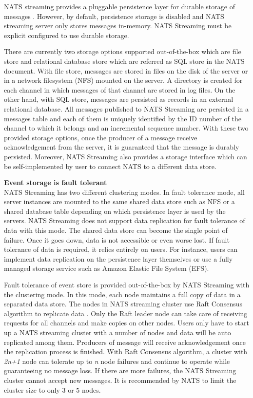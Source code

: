 NATS streaming provides a pluggable persistence layer for durable storage of messages \cite{natsstorage}. However, by default, persistence storage is disabled and NATS streaming server only stores messages in-memory. NATS Streaming must be explicit configured to use durable storage. 

There are currently two storage options supported out-of-the-box which are file store and relational database store which are referred as SQL store in the NATS document. With file store, messages are stored in files on the disk of the server or in a network filesystem (NFS) mounted on the server. A directory is created for each channel in which messages of that channel are stored in log files. On the other hand, with SQL store, messages are persisted as records in an external relational database. All messages published to NATS Streaming are persisted in a messages table and each of them is uniquely identified by the ID number of the channel to which it belongs and an incremental sequence number. With these two provided storage options, once the producer of a message receive acknowledgement from the server, it is guaranteed that the message is durably persisted. Moreover, NATS Streaming also provides a storage interface which can be self-implemented by user to connect NATS to a different data store. 

\textbf{Event storage is fault tolerant}\\
NATS Streaming has two different clustering modes. In fault tolerance mode, all server instances are mounted to the same shared data store such as NFS or a shared database table depending on which persistence layer is used by the servers. NATS Streaming does not support data replication for fault tolerance of data with this mode. The shared data store can become the single point of failure. Once it goes down, data is not accessible or even worse lost. If fault tolerance of data is required, it relies entirely on users. For instance, users can implement data replication on the persistence layer themselves or use a fully managed storage service such as Amazon Elastic File System (EFS). 

Fault tolerance of event store is provided out-of-the-box by NATS Streaming with the clustering mode. In this mode, each node maintains a full copy of data in a separated data store. The nodes in NATS streaming cluster use Raft Consensus algorithm to replicate data \cite{raftalg}. Only the Raft leader node can take care of receiving requests for all channels and make copies on other nodes. Users only have to start up a NATS streaming cluster with a number of nodes and data will be auto replicated among them. Producers of message will receive acknowledgement once the replication process is finished. With Raft Consensus algorithm, a cluster with \emph{2n+1} node can tolerate up to \emph{n} node failures and continue to operate while guaranteeing no message loss. If there are more failures, the NATS Streaming cluster cannot accept new messages. It is recommended by NATS to limit the cluster size to only 3 or 5 nodes.

